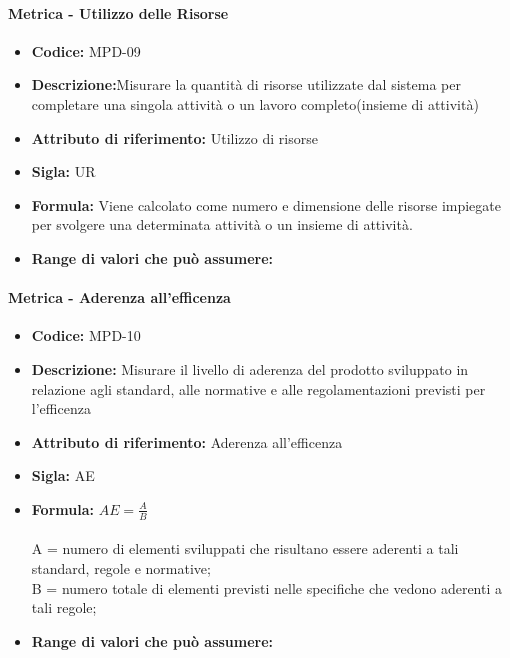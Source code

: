                \paragraph{Metrica - Utilizzo delle Risorse} 
                  \begin{itemize}
         \item   \textbf{Codice:} MPD-09
         \item   \textbf{Descrizione:}Misurare la quantità di risorse utilizzate dal sistema per completare una singola attività o un lavoro completo(insieme di attività)
          \item  \textbf{Attributo di riferimento:} Utilizzo di risorse
          \item  \textbf{Sigla:} UR
           \item \textbf{Formula:} Viene calcolato come numero e dimensione delle risorse impiegate per svolgere una determinata attività o un insieme di attività.
        \item   \textbf{Range di valori che può assumere:}
      \end{itemize}
      
               \paragraph{Metrica - Aderenza all'efficenza} 
                  \begin{itemize}
          \item  \textbf{Codice:} MPD-10
          \item  \textbf{Descrizione:} Misurare il livello di aderenza del prodotto sviluppato in relazione agli standard, alle normative e alle regolamentazioni previsti per l'efficenza
          \item  \textbf{Attributo di riferimento:} Aderenza all'efficenza 
          \item  \textbf{Sigla:} AE
          \item  \textbf{Formula:} \begin{math}AE = \frac{A}{B}\end{math}\\ \\
            A = numero di elementi sviluppati che risultano essere aderenti a tali standard, regole e normative;\\
            B = numero totale di elementi previsti nelle specifiche che vedono aderenti a tali regole;
         
         \item  \textbf{Range di valori che può assumere:}
      \end{itemize}
      

